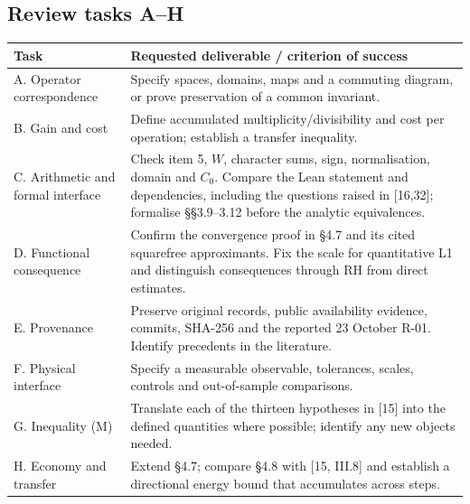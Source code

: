 \documentclass[11pt,a4paper]{article}
\newenvironment{tabla}{\par\smallskip\small}{\par\smallskip}
\begin{document}
\subsection{Review tasks A--H}
\begin{tabla}\begin{xltabular}{\linewidth}{@{}P{3.7cm}L@{}}\toprule
Task & Requested deliverable / criterion of success\\\midrule\endhead
A. Operator correspondence & Specify spaces, domains, maps and a commuting diagram, or prove preservation of a common invariant.\\
B. Gain and cost & Define accumulated multiplicity/divisibility and cost per operation; establish a transfer inequality.\\
C. Arithmetic and formal interface & Check item 5, $W$, character sums, sign, normalisation, domain and $C_0$. Compare the Lean statement and dependencies, including the questions raised in [16,32]; formalise §§3.9--3.12 before the analytic equivalences.\\
D. Functional consequence & Confirm the convergence proof in §4.7 and its cited squarefree approximants. Fix the scale for quantitative L1 and distinguish consequences through RH from direct estimates.\\
E. Provenance & Preserve original records, public availability evidence, commits, SHA-256 and the reported 23 October R-01. Identify precedents in the literature.\\
F. Physical interface & Specify a measurable observable, tolerances, scales, controls and out-of-sample comparisons.\\
G. Inequality (M) & Translate each of the thirteen hypotheses in [15] into the defined quantities where possible; identify any new objects needed.\\
H. Economy and transfer & Extend §4.7; compare §4.8 with [15, III.8] and establish a directional energy bound that accumulates across steps.\\\bottomrule\end{xltabular}\end{tabla}
\end{document}
